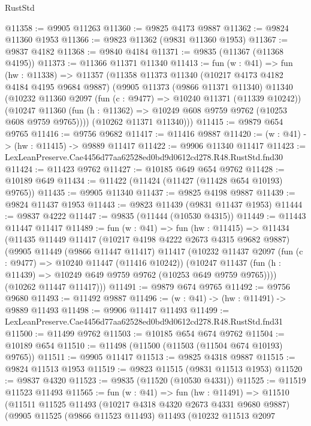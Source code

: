 \begin{lexlean}{RustStd}
\begin{coremodule}
@11358 := @9905 @11263
@11360 := @9825 @4173 @9887
@11362 := @9824 @11360 @1953
@11366 := @9823 @11362 (@9831 @11360 @1953)
@11367 := @9837 @4182
@11368 := @9840 @4184
@11371 := @9835 (@11367 (@11368 @4195))
@11373 := @11366 @11371 @11340
@11413 := fun (w : @41) =>
  fun (hw : @11338) =>
  @11357
    (@11358
      @11373
      @11340
      (@10217 @4173 @4182 @4184 @4195 @9684 @9887)
      (@9905
        @11373
        (@9866 @11371 @11340)
        @11340
        (@10232
          @11360
          @2097
          (fun (c : @9477) => @10240 @11371 (@11339 @10242))
          (@10247 @11360 (fun (h : @11362) => @10249 @608 @9759 @9762 (@10253 @608 @9759 @9765))))
        (@10262 @11371 @11340)))
@11415 := @9879 @654 @9765
@11416 := @9756 @9682
@11417 := @11416 @9887
@11420 := (w : @41) -> (hw : @11415) -> @9889 @11417
@11422 := @9906 @11340 @11417
@11423 := LexLeanPreserve.Cae4456d77aa62528ed0bd9d0612cd278.R48.RustStd.fnd30
@11424 := @11423 @9762
@11427 := @10185 @649 @654 @9762
@11428 := @10189 @649
@11434 := @11422 (@11424 (@11427 (@11428 @654 @10193) @9765))
@11435 := @9905 @11340
@11437 := @9825 @4198 @9887
@11439 := @9824 @11437 @1953
@11443 := @9823 @11439 (@9831 @11437 @1953)
@11444 := @9837 @4222
@11447 := @9835 (@11444 (@10530 @4315))
@11449 := @11443 @11447 @11417
@11489 := fun (w : @41) =>
  fun (hw : @11415) =>
  @11434
    (@11435
      @11449
      @11417
      (@10217 @4198 @4222 @2673 @4315 @9682 @9887)
      (@9905
        @11449
        (@9866 @11447 @11417)
        @11417
        (@10232
          @11437
          @2097
          (fun (c : @9477) => @10240 @11447 (@11416 @10242))
          (@10247 @11437 (fun (h : @11439) => @10249 @649 @9759 @9762 (@10253 @649 @9759 @9765))))
        (@10262 @11447 @11417)))
@11491 := @9879 @674 @9765
@11492 := @9756 @9680
@11493 := @11492 @9887
@11496 := (w : @41) -> (hw : @11491) -> @9889 @11493
@11498 := @9906 @11417 @11493
@11499 := LexLeanPreserve.Cae4456d77aa62528ed0bd9d0612cd278.R48.RustStd.fnd31
@11500 := @11499 @9762
@11503 := @10185 @654 @674 @9762
@11504 := @10189 @654
@11510 := @11498 (@11500 (@11503 (@11504 @674 @10193) @9765))
@11511 := @9905 @11417
@11513 := @9825 @4318 @9887
@11515 := @9824 @11513 @1953
@11519 := @9823 @11515 (@9831 @11513 @1953)
@11520 := @9837 @4320
@11523 := @9835 (@11520 (@10530 @4331))
@11525 := @11519 @11523 @11493
@11565 := fun (w : @41) =>
  fun (hw : @11491) =>
  @11510
    (@11511
      @11525
      @11493
      (@10217 @4318 @4320 @2673 @4331 @9680 @9887)
      (@9905
        @11525
        (@9866 @11523 @11493)
        @11493
        (@10232
          @11513
          @2097

\end{coremodule}
\end{lexlean}
